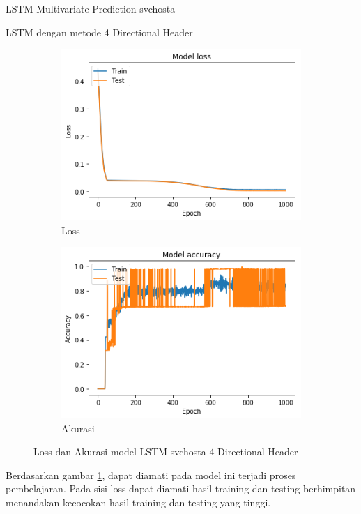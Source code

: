 \documentclass[t]{beamer}
\begin{document}
\begin{frame}{LSTM Multivariate Prediction svchosta}
\begin{subfigure}[b]{0.3\linewidth}
    \end{subfigure}
\end{frame}
\begin{frame}{LSTM dengan metode 4 Directional Header}
   \begin{figure}[H]
   \begin{subfigure}[b]{.45\linewidth}
        \includegraphics[width=\textwidth]{public/assets/img/lstm4_svchosta_loss.png}
        \caption{Loss}
   \end{subfigure}
   \begin{subfigure}[b]{.45\linewidth}
        \includegraphics[width=\textwidth]{public/assets/img/lstm4_svchosta_acc.png}
        \caption{Akurasi}
   \end{subfigure}
   \caption{Loss dan Akurasi model LSTM svchosta 4 Directional Header}
   \label{fig:lstm4_svchosta}
   \end{figure}
   \par Berdasarkan gambar \ref{fig:lstm4_svchosta}, dapat diamati pada model ini terjadi proses pembelajaran. Pada sisi loss dapat diamati hasil training dan testing berhimpitan menandakan kecocokan hasil training dan testing yang tinggi.
\end{frame}
\end{document}
